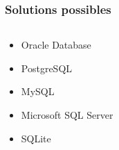 \begin{frame}
\frametitle{Solutions possibles}
\begin{columns}
\begin{column}{5cm}
\begin{itemize}[<+->]
	\item<2-> Oracle Database
	\item<3-> PostgreSQL
	\item<4-> MySQL
	\item<5-> Microsoft SQL Server
	\item<6-> SQLite
\end{itemize}
\end{column}
\begin{column}{7cm}

\begin{figure}
\end{figure}
\end{column}
\end{columns}
\end{frame}
